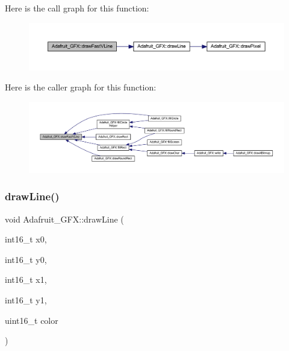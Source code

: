 Here is the call graph for this function\+:\nopagebreak
\begin{figure}[H]
\begin{center}
\leavevmode
\includegraphics[width=350pt]{class_adafruit___g_f_x_a1cffbb1d69c5faf49cd0cff27686a837_cgraph}
\end{center}
\end{figure}
Here is the caller graph for this function\+:\nopagebreak
\begin{figure}[H]
\begin{center}
\leavevmode
\includegraphics[width=350pt]{class_adafruit___g_f_x_a1cffbb1d69c5faf49cd0cff27686a837_icgraph}
\end{center}
\end{figure}
\mbox{\label{class_adafruit___g_f_x_aa0ff662c2b2b48c3bac51f98c777776d}} 
\subsubsection{\texorpdfstring{draw\+Line()}{drawLine()}}
{\footnotesize\ttfamily void Adafruit\+\_\+\+G\+F\+X\+::draw\+Line (\begin{DoxyParamCaption}\item[{int16\+\_\+t}]{x0,  }\item[{int16\+\_\+t}]{y0,  }\item[{int16\+\_\+t}]{x1,  }\item[{int16\+\_\+t}]{y1,  }\item[{uint16\+\_\+t}]{color }\end{DoxyParamCaption})\hspace{0.3cm}{\ttfamily [virtual]}}

